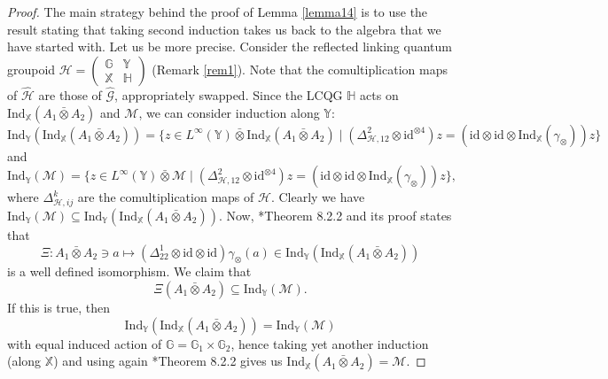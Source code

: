 \documentclass[reqno]{amsart}
\numberwithin{equation}{section}
\newcommand{\id}{\mathrm{id}}
\newcommand{\G}{\mathbb{G}}
\newcommand{\X}{\mathbb{X}}
\newcommand{\Y}{\mathbb{Y}}
\newcommand{\Ind}{\mathrm{Ind}}
\newcommand{\mc}{\mathcal}
\newcommand{\mscr}{\mathscr}
\newcommand{\wh}{\widehat}
\newcommand{\HH}{\mathbb{H}}
\newcommand{\GG}{\mathbb{G}}
\begin{document}
\begin{proof}
The main strategy behind the proof of Lemma \ref{lemma14} is to use the result stating that taking second induction takes us back to the algebra that we have started with. Let us be more precise. Consider the reflected linking quantum groupoid $\mathscr{H}=\begin{pmatrix}
\GG & \Y \\ \X & \HH
\end{pmatrix}$ (Remark \ref{rem1}). Note that the comultiplication maps of $\wh{\mathscr{H}}$ are those of $\wh{\mathscr{G}}$, appropriately swapped. Since the LCQG $\HH$ acts on $\Ind_{\X}(A_1\bar\otimes A_2)$ and $\mc{M}$, we can consider induction along $\Y$:
\[
\Ind_{\Y}(\Ind_{\X}(A_1\bar\otimes A_2))=
\{z\in L^{\infty}(\Y)\bar\otimes 
\Ind_{\X}(A_1\bar\otimes A_2)\mid 
(\Delta_{\mscr{H},12}^2\otimes\id^{\otimes 4}) z=
(\id\otimes \id \otimes \Ind_{\X}(\gamma_\otimes))z\}
\]
and
\[
\Ind_{\Y}(\mc{M})=
\{z\in L^{\infty}(\Y)\bar\otimes 
\mc{M}\mid 
(\Delta_{\mscr{H},12}^2\otimes\id^{\otimes 4}) z=
(\id\otimes \id \otimes \Ind_{\X}(\gamma_\otimes))z\},
\]
where $\Delta_{\mscr{H},ij}^k$ are the comultiplication maps of $\mscr{H}$. Clearly we have 
$\Ind_{\Y}(\mc{M})\subseteq
\Ind_{\Y}(\Ind_{\X}(A_1\bar\otimes A_2))$. Now, \cite{DC09}
*{Theorem 8.2.2} and its proof states that
\[
\Xi\colon A_1\bar\otimes A_2\ni a \mapsto
(\Delta^1_{22}\otimes\id\otimes\id)\gamma_{\otimes}(a)\in \Ind_{\Y}(\Ind_{\X}(A_1\bar\otimes A_2))
\]
is a well defined isomorphism. We claim that
\begin{equation}\label{eq47}
\Xi(A_1\bar\otimes A_2)\subseteq \Ind_{\Y}(\mc{M}).
\end{equation}
If this is true, then
\[
\Ind_{\Y}(\Ind_{\X}(A_1\bar\otimes A_2))=\Ind_{\Y}(\mc{M})
\]
with equal induced action of $\G=\G_1\times \G_2$, hence taking yet another induction (along $\X$) and using again \cite{DC09}*{Theorem 8.2.2} gives us $\Ind_{\X}(A_1\bar\otimes A_2)=\mc{M}$.


\end{proof}
\end{document}
